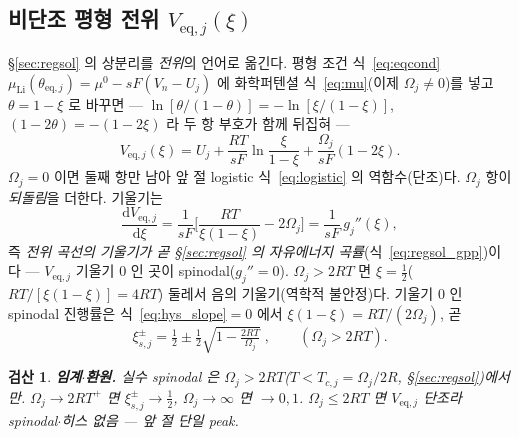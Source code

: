 \documentclass[11pt,a4paper]{article}
\newtheorem*{verifybox}{검산}
\newcommand{\dd}{\mathrm{d}}
\newcommand{\eq}{\mathrm{eq}}
\begin{document}
\subsection{비단조 평형 전위 $V_{\eq,j}(\xi)$}
\S\ref{sec:regsol} 의 상분리를 \emph{전위}의 언어로 옮긴다. 평형 조건 식~\eqref{eq:eqcond}
$\mu_\mathrm{Li}(\theta_{\eq,j})=\mu^0-sF(V_n-U_j)$ 에 화학퍼텐셜 식~\eqref{eq:mu}(이제 $\Omega_j\ne0$)를 넣고
$\theta=1-\xi$ 로 바꾸면 — $\ln[\theta/(1-\theta)]=-\ln[\xi/(1-\xi)]$, $(1-2\theta)=-(1-2\xi)$ 라 두 항 부호가 함께
뒤집혀 —
\begin{equation}
V_{\eq,j}(\xi)=U_j+\frac{RT}{sF}\ln\frac{\xi}{1-\xi}+\frac{\Omega_j}{sF}(1-2\xi).
\label{eq:hys_Veq}
\end{equation}
$\Omega_j=0$ 이면 둘째 항만 남아 앞 절 logistic 식~\eqref{eq:logistic} 의 역함수(단조)다. $\Omega_j$ 항이
\emph{되돌림}을 더한다. 기울기는
\begin{equation}
\frac{\dd V_{\eq,j}}{\dd\xi}=\frac{1}{sF}\Big[\frac{RT}{\xi(1-\xi)}-2\Omega_j\Big]=\frac{1}{sF}\,g_j''(\xi),
\label{eq:hys_slope}
\end{equation}
즉 \emph{전위 곡선의 기울기가 곧 \S\ref{sec:regsol} 의 자유에너지 곡률}(식~\eqref{eq:regsol_gpp})이다 —
$V_{\eq,j}$ 기울기 $0$ 인 곳이 spinodal($g_j''=0$). $\Omega_j>2RT$ 면 $\xi=\tfrac12$($RT/[\xi(1-\xi)]=4RT$) 둘레서
음의 기울기(역학적 불안정)다. 기울기 $0$ 인 spinodal 진행률은 식~\eqref{eq:hys_slope}$=0$ 에서
$\xi(1-\xi)=RT/(2\Omega_j)$, 곧
\begin{equation}
\boxed{\;\xi_{s,j}^\pm=\tfrac12\pm\tfrac12\sqrt{1-\tfrac{2RT}{\Omega_j}}\;,\qquad(\Omega_j>2RT).\;}
\label{eq:hys_spinodal}
\end{equation}
\begin{verifybox}
\textbf{임계$\cdot$환원.} 실수 spinodal 은 $\Omega_j>2RT$($T<T_{c,j}=\Omega_j/2R$, \S\ref{sec:regsol})에서만. $\Omega_j
\to2RT^+$ 면 $\xi_{s,j}^\pm\to\tfrac12$, $\Omega_j\to\infty$ 면 $\to0,1$. $\Omega_j\le2RT$ 면 $V_{\eq,j}$ 단조라
spinodal$\cdot$히스 없음 — 앞 절 단일 peak.
\end{verifybox}
\end{document}
